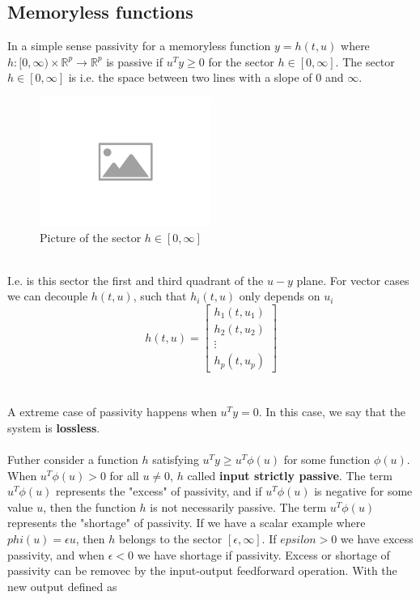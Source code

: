 \documentclass{article}
\begin{document}
\subsection{Memoryless functions}
In a simple sense passivity for a memoryless function $y = h(t,u)$ where $h : [0, \infty ) \times \mathbb{R}^p \to \mathbb{R}^{p}$ is passive if $u^T y \geq 0$ for the sector $h \in [0, \infty]$. The sector $h \in [0, \infty]$ is i.e. the space between two lines with a slope of $0$ and $\infty$.
\begin{figure}[h!]
	\centering
	\includegraphics[width = 0.5\textwidth]{figures/placeholder-image.png}
	\caption{Picture of the sector $h \in [0, \infty]$}
\end{figure}
\\
I.e. is this sector the first and third quadrant of the $u-y$ plane. For vector cases we can decouple $h(t,u)$, such that $h_i(t,u)$ only depends on $u_i$
\begin{equation*}
	h(t,u) = \begin{bmatrix}
		h_1(t,u_1) \\
		h_2(t,u_2) \\
		\vdots     \\
		h_p(t,u_p)
	\end{bmatrix}
\end{equation*}
\\\\
A extreme case of passivity happens when $u^{T}y=0$. In this case, we say that the system is \textbf{lossless}.
\\\\
Futher consider a function $h$ satisfying $u^{T}y \geq u^{T} \phi (u)$ for some function $\phi(u)$. When $u^{T} \phi(u) > 0$ for all $u \neq 0$, $h$ called \textbf{input strictly passive}. The term $u^{T}\phi (u)$ represents the "excess" of passivity, and if $u^{T}\phi (u)$ is negative for some value $u$, then the function $h$ is not necessarily passive. The term $u^{T} \phi (u)$ represents the "shortage" of passivity. If we have a scalar example where $phi(u) = \epsilon u$, then $h$ belongs to the sector $[\epsilon , \infty ]$. If $epsilon > 0$ we have excess passivity, and when $\epsilon  < 0$ we have shortage if passivity. Excess or shortage of passivity can be removec by the input-output feedforward operation. With the new output defined as
\end{document}

